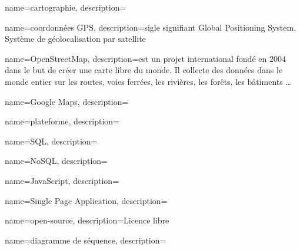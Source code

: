 \makeglossaries

{
    name=cartographie,
    description={}
}
 
{
    name=coordonnées GPS,
    description={sigle signifiant Global Positioning System. Système de géolocalisation par satellite}
}

{
    name=OpenStreetMap,
    description={est un projet international fondé en 2004 dans le but de créer une carte libre du monde. Il collecte des données dans le monde entier sur les routes, voies ferrées, les rivières, les forêts, les bâtiments …}
}

{
    name=Google Maps,
    description={}
}

{
    name=plateforme,
    description={}
}

{
    name=SQL,
    description={}
}

{
    name=NoSQL,
    description={}
}

{
    name=JavaScript,
    description={}
}

{
    name=Single Page Application,
    description={}
}

{
    name=open-source,
    description={Licence libre}
}

{
    name=diagramme de séquence,
    description={}
}
